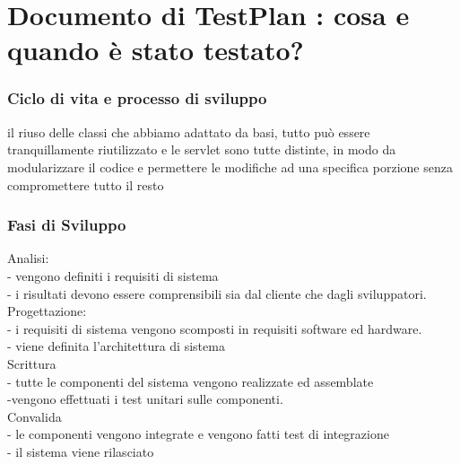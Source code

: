 \documentclass[a4paper,12pt]{beamer}
\begin{document}
\pagebreak

\section{Documento di TestPlan : cosa e quando è stato testato?}
\begin{frame}
\frametitle{Ciclo di vita e processo di sviluppo}
il riuso delle classi che abbiamo adattato da basi, tutto può essere tranquillamente riutilizzato e le servlet sono tutte distinte, in modo da modularizzare il codice e permettere le modifiche ad una specifica porzione senza compromettere tutto il resto
\end{frame}

\begin{frame}
\frametitle{Fasi di Sviluppo}
Analisi:\\
- vengono definiti i requisiti di sistema\\
- i risultati devono essere comprensibili sia dal cliente che dagli sviluppatori.\\
Progettazione:\\
- i requisiti di sistema vengono scomposti in requisiti software ed hardware.\\
- viene definita l’architettura di sistema\\
Scrittura \\
- tutte le componenti del sistema vengono realizzate ed assemblate  \\
-vengono effettuati i test unitari sulle componenti.\\
Convalida\\
- le componenti vengono integrate e vengono fatti test di integrazione\\
- il sistema viene rilasciato\\
\end{frame}
\end{document}
